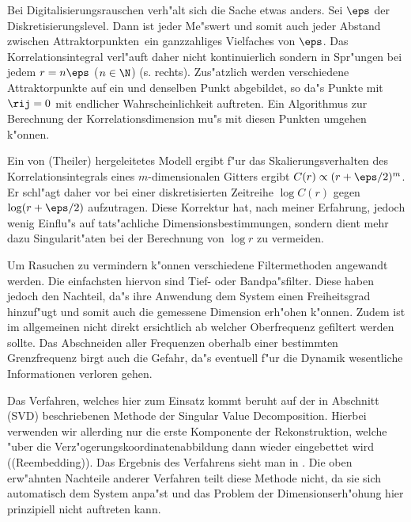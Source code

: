 Bei Digitalisierungsrauschen verh"alt sich die Sache etwas anders. Sei $\eps$ der
Diskretisierungslevel. Dann ist jeder Me"swert und somit auch jeder Abstand zwischen
Attraktorpunkten\footnotemark\  ein ganzzahliges Vielfaches von $\eps$. Das Korrelationsintegral
verl"auft daher nicht kontinuierlich sondern in Spr"ungen bei jedem $r=n\eps$ ($n\in\N$)
(s.  rechts). 
 Zus"atzlich werden verschiedene Attraktorpunkte auf ein und denselben Punkt
abgebildet, so da"s Punkte mit $\rij=0$ mit endlicher Wahrscheinlichkeit auftreten. Ein
Algorithmus zur Berechnung der Korrelationsdimension mu"s mit diesen Punkten umgehen
k"onnen.

Ein von \autor(Theiler) hergeleitetes Modell ergibt f"ur das Skalierungsverhalten des
Korrelationsintegrals eines $m$-dimensionalen Gitters ergibt $C(r)\propto(r+\eps/2)^m$. Er 
schl"agt daher vor bei einer diskretisierten Zeitreihe $\log C(r)$ gegen $\log(r+\eps/2)$
aufzutragen\footnotemark. Diese Korrektur hat, nach meiner Erfahrung, jedoch wenig
Einflu"s auf tats"achliche Dimensionsbestimmungen, sondern dient mehr dazu Singularit"aten 
bei der Berechnung von $\log r$ zu vermeiden.

Um Rasuchen zu vermindern k"onnen verschiedene Filtermethoden angewandt werden. Die
einfachsten hiervon sind Tief- oder Bandpa"sfilter. Diese haben jedoch den Nachteil, da"s
ihre Anwendung dem System einen Freiheitsgrad hinzuf"ugt und somit auch die gemessene
Dimension erh"ohen k"onnen. Zudem ist im allgemeinen nicht direkt ersichtlich ab welcher
Oberfrequenz gefiltert werden sollte. Das Abschneiden aller Frequenzen oberhalb einer
bestimmten Grenzfrequenz birgt auch die Gefahr, da"s eventuell f"ur die Dynamik
wesentliche Informationen verloren gehen.

Das Verfahren, welches hier zum Einsatz kommt beruht auf der in Abschnitt \korrektur(SVD)
beschriebenen Methode der Singular Value Decomposition. Hierbei verwenden wir allerding
nur die erste Komponente der Rekonstruktion, welche "uber die
Verz"ogerungskoordinatenabbildung dann wieder eingebettet wird (\begriff(Reembedding)).
Das Ergebnis des Verfahrens sieht man in . Die oben erw"ahnten Nachteile 
anderer Verfahren teilt diese Methode nicht, da sie sich automatisch dem System anpa"st
und das Problem der Dimensionserh"ohung hier prinzipiell nicht auftreten kann.


